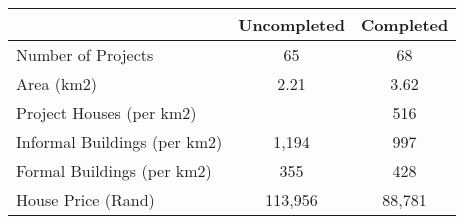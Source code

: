 \begin{tabular}{l*{1}{cc}}
 &Uncompleted &Completed  \\
\hline 
Number of Projects &         65 &         68  \\
Area (km2) &       2.21 &       3.62  \\
Project Houses (per km2) &  &        516  \\
Informal Buildings (per km2) &      1,194 &        997  \\
Formal Buildings (per km2) &        355 &        428  \\
House Price (Rand) &    113,956 &     88,781  \\
\hline
\end{tabular}